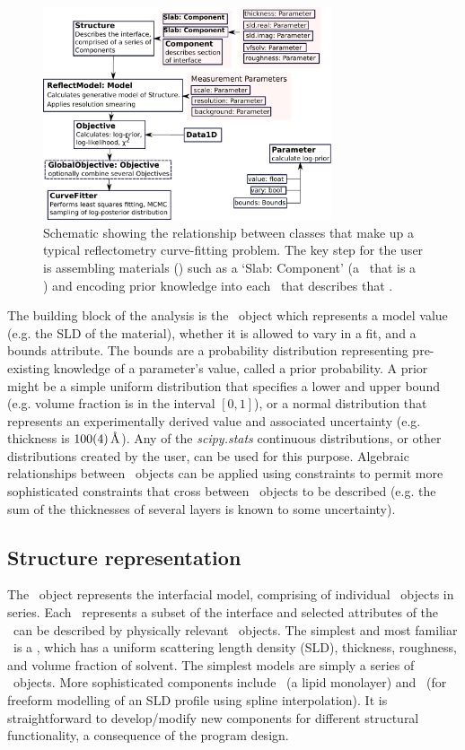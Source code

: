 \documentclass[pdf,preprint]{iucr}
\begin{document}
\begin{figure}
  \includegraphics[width=85mm]{components.pdf}
  \caption{Schematic showing the relationship between classes that make up a typical reflectometry curve-fitting problem. The key step for the user is assembling materials (\Component) such as a `Slab: Component' (a \Component\ that is a \Slab) and encoding prior knowledge into each \Parameter\ that describes that \Component.}
  \label{fig:components}
\end{figure}

The building block of the analysis is the \Parameter\ object which represents a model value (e.g. the SLD of the material), whether it is allowed to vary in a fit, and a bounds attribute. The bounds are a probability distribution representing pre-existing knowledge of a parameter's value, called a prior probability.
A prior might be a simple uniform distribution that specifies a lower and upper bound (e.g. volume fraction is in the interval $[0, 1]$), or a normal distribution that represents an experimentally derived value and associated uncertainty (e.g. thickness is $\SI{100+-4}{\angstrom}$).
Any of the \emph{scipy.stats} \cite{Jones2001-2017} continuous distributions, or other distributions created by the user, can be used for this purpose. Algebraic relationships between \Parameter\ objects can be applied using constraints to permit more sophisticated constraints that cross between \Component\ objects to be described (e.g. the sum of the thicknesses of several layers is known to some uncertainty).

\subsection{Structure representation}

The \Structure\ object represents the interfacial model, comprising of individual \Component\ objects in series. Each \Component\ represents a subset of the interface and selected attributes of the \Component\ can be described by physically relevant \Parameter\ objects. The simplest and most familiar \Component\ is a \Slab, which has a uniform scattering length density (SLD), thickness, roughness, and volume fraction of solvent. The simplest models are simply a series of \Slab\ objects.
More sophisticated components include \LipidLeaflet\ (a lipid monolayer) and \Spline\ (for freeform modelling of an SLD profile using spline interpolation).
It is straightforward to develop/modify new components for different structural functionality, a consequence of the program design.
\end{document}
